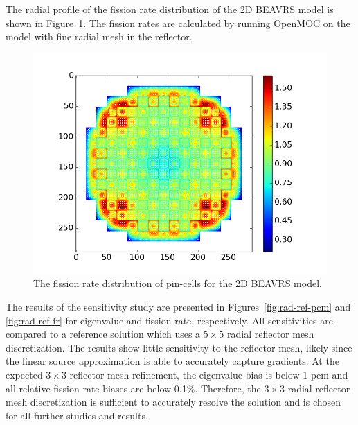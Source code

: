The radial profile of the fission rate distribution of the 2D BEAVRS model is shown in Figure~\ref{fig:beavrs-2d-radial}. The fission rates are calculated by running OpenMOC on the model with fine radial mesh in the reflector.

\begin{figure}[h!]
	\centering
	\includegraphics[width=0.9\linewidth]{figures/results/rr-plots/beavrs-2d-radial.png}
	\caption[]{The fission rate distribution of pin-cells for the 2D BEAVRS model.}
	\label{fig:beavrs-2d-radial}
\end{figure}

The results of the sensitivity study are presented in Figures~\ref{fig:rad-ref-pcm} and \ref{fig:rad-ref-fr} for eigenvalue and fission rate, respectively. All sensitivities are compared to a reference solution which uses a $5\times 5$ radial reflector mesh discretization. The results show little sensitivity to the reflector mesh, likely since the linear source approximation is able to accurately capture gradients. At the expected $3 \times 3$ reflector mesh refinement, the eigenvalue bias is below 1 pcm and all relative fission rate biases are below 0.1\%. Therefore, the  $3 \times 3$ radial reflector mesh discretization is sufficient to accurately resolve the solution and is chosen for all further studies and results.

